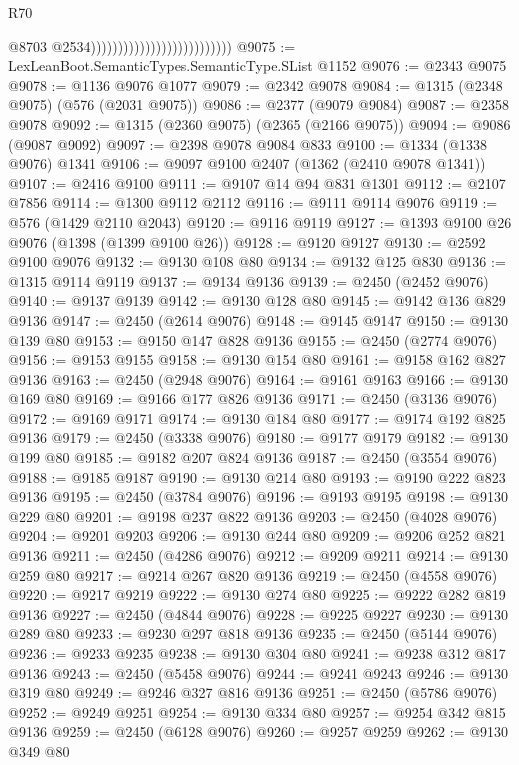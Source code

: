 \begin{lexlean}{R70}
\begin{coremodule}
                                                        @8703
                                                        @2534))))))))))))))))))))))))))
@9075 := LexLeanBoot.SemanticTypes.SemanticType.SList @1152
@9076 := @2343 @9075
@9078 := @1136 @9076 @1077
@9079 := @2342 @9078
@9084 := @1315 (@2348 @9075) (@576 (@2031 @9075))
@9086 := @2377 (@9079 @9084)
@9087 := @2358 @9078
@9092 := @1315 (@2360 @9075) (@2365 (@2166 @9075))
@9094 := @9086 (@9087 @9092)
@9097 := @2398 @9078 @9084 @833
@9100 := @1334 (@1338 @9076) @1341
@9106 := @9097 @9100 @2407 (@1362 (@2410 @9078 @1341))
@9107 := @2416 @9100
@9111 := @9107 @14 @94 @831 @1301
@9112 := @2107 @7856
@9114 := @1300 @9112 @2112
@9116 := @9111 @9114 @9076
@9119 := @576 (@1429 @2110 @2043)
@9120 := @9116 @9119
@9127 := @1393 @9100 @26 @9076 (@1398 (@1399 @9100 @26))
@9128 := @9120 @9127
@9130 := @2592 @9100 @9076
@9132 := @9130 @108 @80
@9134 := @9132 @125 @830
@9136 := @1315 @9114 @9119
@9137 := @9134 @9136
@9139 := @2450 (@2452 @9076)
@9140 := @9137 @9139
@9142 := @9130 @128 @80
@9145 := @9142 @136 @829 @9136
@9147 := @2450 (@2614 @9076)
@9148 := @9145 @9147
@9150 := @9130 @139 @80
@9153 := @9150 @147 @828 @9136
@9155 := @2450 (@2774 @9076)
@9156 := @9153 @9155
@9158 := @9130 @154 @80
@9161 := @9158 @162 @827 @9136
@9163 := @2450 (@2948 @9076)
@9164 := @9161 @9163
@9166 := @9130 @169 @80
@9169 := @9166 @177 @826 @9136
@9171 := @2450 (@3136 @9076)
@9172 := @9169 @9171
@9174 := @9130 @184 @80
@9177 := @9174 @192 @825 @9136
@9179 := @2450 (@3338 @9076)
@9180 := @9177 @9179
@9182 := @9130 @199 @80
@9185 := @9182 @207 @824 @9136
@9187 := @2450 (@3554 @9076)
@9188 := @9185 @9187
@9190 := @9130 @214 @80
@9193 := @9190 @222 @823 @9136
@9195 := @2450 (@3784 @9076)
@9196 := @9193 @9195
@9198 := @9130 @229 @80
@9201 := @9198 @237 @822 @9136
@9203 := @2450 (@4028 @9076)
@9204 := @9201 @9203
@9206 := @9130 @244 @80
@9209 := @9206 @252 @821 @9136
@9211 := @2450 (@4286 @9076)
@9212 := @9209 @9211
@9214 := @9130 @259 @80
@9217 := @9214 @267 @820 @9136
@9219 := @2450 (@4558 @9076)
@9220 := @9217 @9219
@9222 := @9130 @274 @80
@9225 := @9222 @282 @819 @9136
@9227 := @2450 (@4844 @9076)
@9228 := @9225 @9227
@9230 := @9130 @289 @80
@9233 := @9230 @297 @818 @9136
@9235 := @2450 (@5144 @9076)
@9236 := @9233 @9235
@9238 := @9130 @304 @80
@9241 := @9238 @312 @817 @9136
@9243 := @2450 (@5458 @9076)
@9244 := @9241 @9243
@9246 := @9130 @319 @80
@9249 := @9246 @327 @816 @9136
@9251 := @2450 (@5786 @9076)
@9252 := @9249 @9251
@9254 := @9130 @334 @80
@9257 := @9254 @342 @815 @9136
@9259 := @2450 (@6128 @9076)
@9260 := @9257 @9259
@9262 := @9130 @349 @80

\end{coremodule}
\end{lexlean}
